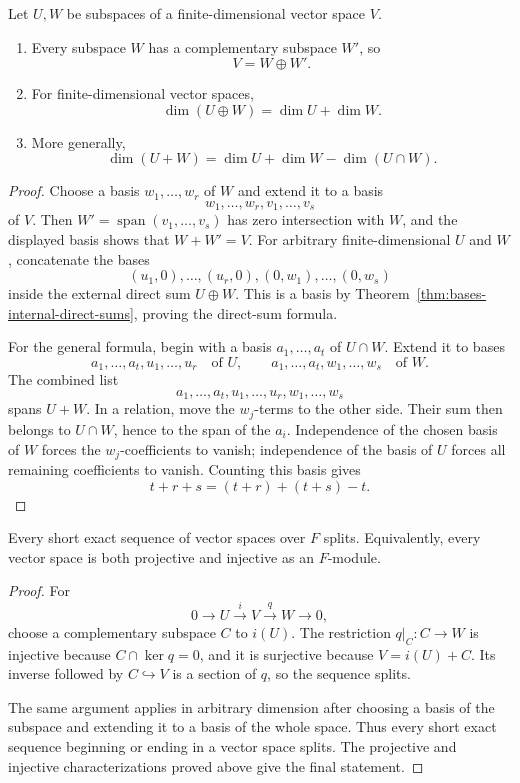 \begin{proposition}\label{prop:dimension-formulas}
Let \(U,W\) be subspaces of a finite-dimensional vector space \(V\).
\begin{enumerate}
\item Every subspace \(W\) has a complementary subspace \(W'\), so
\[
V=W\oplus W'.
\]
\item For finite-dimensional vector spaces,
\[
\dim(U\oplus W)=\dim U+\dim W.
\]
\item More generally,
\[
\dim(U+W)=\dim U+\dim W-\dim(U\cap W).
\]
\end{enumerate}
\end{proposition}
\begin{proof}
Choose a basis \(w_1,\ldots,w_r\) of \(W\) and extend it to a basis
\[
w_1,\ldots,w_r,v_1,\ldots,v_s
\]
of \(V\).  Then \(W'=\operatorname{span}(v_1,\ldots,v_s)\) has zero
intersection with \(W\), and the displayed basis shows that \(W+W'=V\).
For arbitrary finite-dimensional \(U\) and \(W\), concatenate the bases
\[
(u_1,0),\ldots,(u_r,0),(0,w_1),\ldots,(0,w_s)
\]
  inside the external direct sum \(U\oplus W\). This is a basis by
  Theorem~\ref{thm:bases-internal-direct-sums}, proving the direct-sum formula.

For the general formula, begin with a basis
\(a_1,\ldots,a_t\) of \(U\cap W\).  Extend it to bases
\[
a_1,\ldots,a_t,u_1,\ldots,u_r\quad\text{of }U,
\qquad
a_1,\ldots,a_t,w_1,\ldots,w_s\quad\text{of }W.
\]
The combined list
\[
a_1,\ldots,a_t,u_1,\ldots,u_r,w_1,\ldots,w_s
\]
spans \(U+W\).  In a relation, move the \(w_j\)-terms to the other side.
Their sum then belongs to \(U\cap W\), hence to the span of the \(a_i\).
Independence of the chosen basis of \(W\) forces the \(w_j\)-coefficients
to vanish; independence of the basis of \(U\) forces all remaining
coefficients to vanish.  Counting this basis gives
\[
t+r+s=(t+r)+(t+s)-t.
\]
\end{proof}

\begin{corollary}\label{cor:vector-space-splitting}
Every short exact sequence of vector spaces over \(F\) splits.  Equivalently,
every vector space is both projective and injective as an \(F\)-module.
\end{corollary}
\begin{proof}
For
\[
0\longrightarrow U\xrightarrow{i}V\xrightarrow{q}W\longrightarrow0,
\]
choose a complementary subspace \(C\) to \(i(U)\).  The restriction
\(q|_C:C\to W\) is injective because \(C\cap\ker q=0\), and it is
surjective because \(V=i(U)+C\).  Its inverse followed by \(C\hookrightarrow
V\) is a section of \(q\), so the sequence splits.

The same argument applies in arbitrary dimension after choosing a basis of
the subspace and extending it to a basis of the whole space.  Thus every
short exact sequence beginning or ending in a vector space splits.  The
projective and injective characterizations proved above give the final
statement.
\end{proof}

